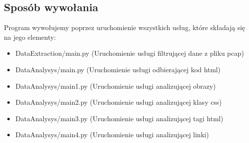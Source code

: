 \documentclass[12pt]{article}
\begin{document}
\subsection{Sposób wywołania}
Program wywołujemy poprzez uruchomienie wszystkich usług, które składają się na jego elementy:
\begin{itemize}
\item DataExtraction/main.py (Uruchomienie usługi filtrującej dane z pliku pcap)
\item DataAnalysys/main.py (Uruchomienie usługi odbierającej kod html)
\item DataAnalysys/main1.py (Uruchomienie usługi analizującej obrazy)
\item DataAnalysys/main2.py (Uruchomienie usługi analizującej klasy css)
\item DataAnalysys/main3.py (Uruchomienie usługi analizującej tagi html)
\item DataAnalysys/main4.py (Uruchomienie usługi analizującej linki)
\end{itemize}
\end{document}
